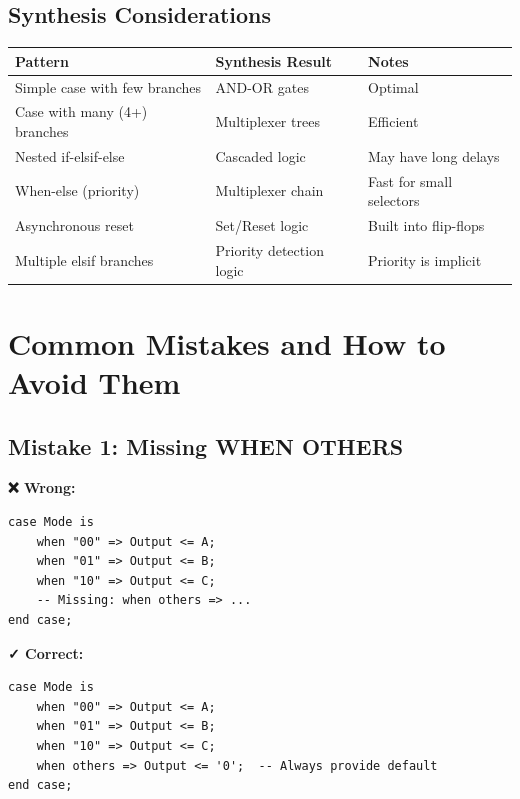 \documentclass[12pt,a4paper]{article}
\begin{document}
\subsection{Synthesis Considerations}

\begin{table}[h]
\centering
\begin{tabular}{|l|p{5cm}|p{4cm}|}
\hline
\textbf{Pattern} & \textbf{Synthesis Result} & \textbf{Notes} \\
\hline
Simple case with few branches & AND-OR gates & Optimal \\
\hline
Case with many (4+) branches & Multiplexer trees & Efficient \\
\hline
Nested if-elsif-else & Cascaded logic & May have long delays \\
\hline
When-else (priority) & Multiplexer chain & Fast for small selectors \\
\hline
Asynchronous reset & Set/Reset logic & Built into flip-flops \\
\hline
Multiple elsif branches & Priority detection logic & Priority is implicit \\
\hline
\end{tabular}
\end{table}

\newpage
\section{Common Mistakes and How to Avoid Them}

\subsection{Mistake 1: Missing WHEN OTHERS}

\textbf{❌ Wrong:}
\begin{lstlisting}
case Mode is
    when "00" => Output <= A;
    when "01" => Output <= B;
    when "10" => Output <= C;
    -- Missing: when others => ...
end case;
\end{lstlisting}

\textbf{✓ Correct:}
\begin{lstlisting}
case Mode is
    when "00" => Output <= A;
    when "01" => Output <= B;
    when "10" => Output <= C;
    when others => Output <= '0';  -- Always provide default
end case;
\end{lstlisting}
\end{document}
